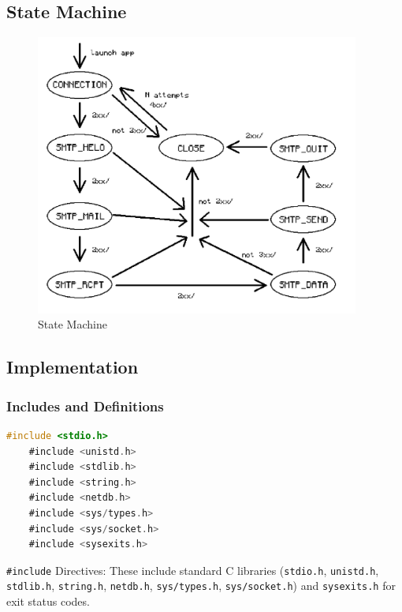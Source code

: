 \documentclass[12pt,a4paper]{article}
\begin{document}
    \subsection{State Machine}
    \begin{figure}[H]
        \begin{center}
            \includegraphics[width=0.95\textwidth]{State_Machine.pdf}
        \end{center}
        \caption{State Machine}\label{fig:}
    \end{figure}
    \subsection{Implementation}
    \subsubsection{Includes and Definitions}
    \begin{lstlisting}[language=C]
    #include <stdio.h>
    #include <unistd.h>
    #include <stdlib.h>
    #include <string.h>
    #include <netdb.h>
    #include <sys/types.h>
    #include <sys/socket.h>
    #include <sysexits.h>
    \end{lstlisting}
    \texttt{\#include} Directives: These include standard C libraries (\texttt{stdio.h}, \texttt{unistd.h}, \texttt{stdlib.h}, \texttt{string.h}, \texttt{netdb.h}, \texttt{sys/types.h}, \texttt{sys/socket.h}) and \texttt{sysexits.h} for exit status codes.
    \newpage
\end{document}
